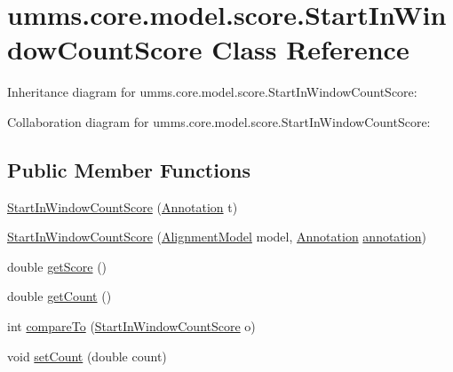 \hypertarget{classumms_1_1core_1_1model_1_1score_1_1_start_in_window_count_score}{\section{umms.\+core.\+model.\+score.\+Start\+In\+Window\+Count\+Score Class Reference}
\label{classumms_1_1core_1_1model_1_1score_1_1_start_in_window_count_score}
}


Inheritance diagram for umms.\+core.\+model.\+score.\+Start\+In\+Window\+Count\+Score\+:


Collaboration diagram for umms.\+core.\+model.\+score.\+Start\+In\+Window\+Count\+Score\+:
\subsection*{Public Member Functions}
\begin{DoxyCompactItemize}
\item 
\hyperlink{classumms_1_1core_1_1model_1_1score_1_1_start_in_window_count_score_addcdc7352fbcb45b25ce9bf450e34e76}{Start\+In\+Window\+Count\+Score} (\hyperlink{interfaceumms_1_1core_1_1annotation_1_1_annotation}{Annotation} t)
\item 
\hyperlink{classumms_1_1core_1_1model_1_1score_1_1_start_in_window_count_score_a8b4e82c682905d6b51301906f4c4a510}{Start\+In\+Window\+Count\+Score} (\hyperlink{classumms_1_1core_1_1model_1_1_alignment_model}{Alignment\+Model} model, \hyperlink{interfaceumms_1_1core_1_1annotation_1_1_annotation}{Annotation} \hyperlink{classumms_1_1core_1_1model_1_1score_1_1_window_score_1_1_abstract_window_score_a455fb02f18f492e611113b9da0a24888}{annotation})
\item 
double \hyperlink{classumms_1_1core_1_1model_1_1score_1_1_start_in_window_count_score_ac19f44fe80ce3d2ad0c236bb62d67c5c}{get\+Score} ()
\item 
double \hyperlink{classumms_1_1core_1_1model_1_1score_1_1_start_in_window_count_score_a3518e08e029c8e6d0dcc8e00c31ec761}{get\+Count} ()
\item 
int \hyperlink{classumms_1_1core_1_1model_1_1score_1_1_start_in_window_count_score_a273b98b70ea1318c32a11c6e880d98b9}{compare\+To} (\hyperlink{classumms_1_1core_1_1model_1_1score_1_1_start_in_window_count_score}{Start\+In\+Window\+Count\+Score} o)
\item 
void \hyperlink{classumms_1_1core_1_1model_1_1score_1_1_start_in_window_count_score_ae19e8397eb8854112bf315c68b94f0c5}{set\+Count} (double count)
\end{DoxyCompactItemize}
